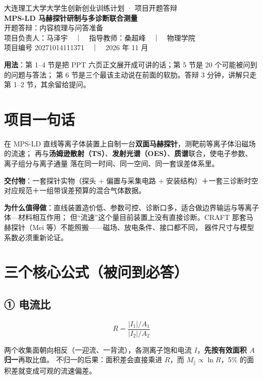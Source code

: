 \documentclass[11pt,a4paper]{ctexart}
\newcommand{\key}[1]{\textbf{\color{accent}#1}}
\begin{document}
\begin{center}
{\small\color{accent}大连理工大学大学生创新创业训练计划 · 项目开题答辩}\\[8pt]
{\LARGE\bfseries MPS-LD 马赫探针研制与多诊断联合测量}\\[6pt]
{\large 开题答辩：内容梳理与问答准备}\\[10pt]
{\small 项目负责人：马泽宇　｜　指导教师：桑超峰　｜　物理学院}\\[3pt]
{\small 项目编号 20271014111371　｜　2026 年 11 月}
\end{center}

\vspace{2pt}
\noindent\colorbox{soft}{\parbox{\dimexpr\linewidth-2\fboxsep}{\small
\textbf{用法}：第 1--4 节是把 PPT 六页正文展开成可讲的话；第 5 节是 20 个可能被问到的问题与答法；
第 6 节是三个最该主动说在前面的软肋。答辩 3 分钟，讲解只走第 1--2 节，其余留给提问。}}

\section{项目一句话}

在 MPS-LD 直线等离子体装置上自制一台\key{双面马赫探针}，测靶前等离子体沿磁场的流速；
再与\key{汤姆逊散射（TS）}、\key{发射光谱（OES）}、\key{质谱}联合，使电子参数、离子组分与离子通量
落在同一时间、同一空间、同一套误差体系里。

\textbf{交付物}：一套探针实物（探头 + 偏置与采集电路 + 安装结构）＋一套三诊断时空对应规范＋一组带误差预算的混合气体数据。

\textbf{为什么值得做}：直线装置造价低、参数可控、诊断口多，适合做边界输运与等离子体—材料相互作用；
但“流速”这个量目前装置上没有直接诊断。CRAFT 那套马赫探针（Mei 等）不能照搬——磁场、放电条件、接口都不同，
器件尺寸与模型系数必须重新论证。

\section{三个核心公式（被问到必答）}

\subsection*{① 电流比}

\begin{equation}
R=\frac{|I_1|/A_1}{|I_2|/A_2}
\end{equation}

两个收集面朝向相反（一迎流、一背流），各测离子饱和电流 $I$，\key{先按有效面积 $A$ 归一}再取比值。
不归一的后果：面积差会直接乘进 $R$，而 $M_\parallel\propto\ln R$，5\% 的面积差就变成可观的流速偏差。
\end{document}
